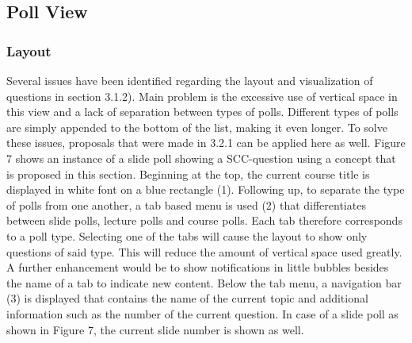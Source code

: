 \subsection{Poll View}

\subsubsection{Layout}
Several issues have been identified regarding the layout and visualization of questions in section 3.1.2). Main problem is the excessive use of vertical space in this view and a lack of separation between types of polls. Different types of polls are simply appended to the bottom of the list, making it even longer. To solve these issues, proposals that were made in 3.2.1 can be applied here as well.  Figure 7 shows an instance of a slide poll showing a SCC-question using a concept that is proposed in this section.
Beginning at the top, the current course title is displayed in white font on a blue rectangle (1). Following up, to separate the type of polls from one another, a tab based menu is used (2) that differentiates between slide polls, lecture polls and course polls. Each tab therefore corresponds to a poll type. Selecting one of the tabs will cause the layout to show only questions of said type. This will reduce the amount of vertical space used greatly. A further enhancement would be to show notifications in little bubbles besides the name of a tab to indicate new content. Below the tab menu, a navigation bar (3) is displayed that contains the name of the current topic and additional information such as the number of the current question. In case of a slide poll as shown in Figure 7, the current slide number is shown as well.
